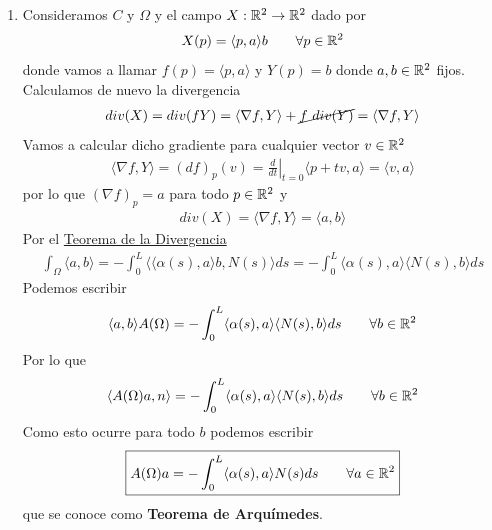 \begin{observacion}
\begin{enumerate}[start=4]
        \item Consideramos $C$ y $\Omega$ y el campo $X:\mathbb{R}^2 \to \mathbb{R}^2$ dado por 
        \begin{gather*}
            X(p)=\langle p, a \rangle b \qquad \forall p \in \mathbb{R}^2
        \end{gather*}
        donde vamos a llamar $f(p)=\langle p, a \rangle$ y $Y(p)=b$ donde $a,b\in \mathbb{R}^2$ fijos. Calculamos de nuevo la divergencia
        \begin{gather*}
            div(X) = div(fY) = \langle \nabla f, Y \rangle + \cancel{f\ div(Y)} = \langle \nabla f, Y \rangle
        \end{gather*}
        Vamos a calcular dicho gradiente para cualquier vector $v\in \mathbb{R}^2$
        \begin{gather*}
            \langle \nabla f, Y \rangle = (df)_p(v) =\left. \frac{d}{dt}\right|_{t=0} \langle p+tv, a\rangle = \langle v,a\rangle
        \end{gather*}
        por lo que $(\nabla f)_p = a$ para todo $p\in \mathbb{R}^2$ y
        \begin{gather*}
            div(X) = \langle \nabla f, Y \rangle = \langle a, b \rangle
        \end{gather*}
        Por el \hyperref[teo:divergencia]{Teorema de la Divergencia}
        \begin{gather*}
            \int_\Omega \langle a,b \rangle = -\int_0^L \langle \langle \alpha(s), a \rangle b, N(s) \rangle ds = - \int_0^L \langle \alpha(s), a \rangle \langle N(s), b \rangle ds
        \end{gather*}
        Podemos escribir
        \begin{gather*}
            \langle a,b\rangle A(\Omega) = -\int_0^L \langle \alpha(s), a \rangle \langle N(s), b \rangle ds \qquad \forall b\in \mathbb{R}^2
        \end{gather*}
        Por lo que 
        \begin{gather*}
            \langle A(\Omega)a, n \rangle = -\int_0^L \langle \alpha(s), a \rangle \langle N(s), b \rangle ds \qquad \forall b\in \mathbb{R}^2
        \end{gather*}
        Como esto ocurre para todo $b$ podemos escribir
        \begin{gather*}
            \boxed{A(\Omega) a = - \int_0^L \langle \alpha(s), a \rangle N(s) ds \qquad \forall a \in \mathbb{R}^2}
        \end{gather*}
        que se conoce como \textbf{Teorema de Arquímedes}.


\end{enumerate}
\end{observacion}
